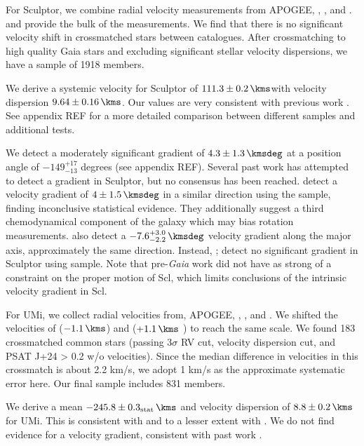 For Sculptor, we combine radial velocity measurements from APOGEE,
\citet{sestito+2023a}, \citet{tolstoy+2023}, and \citet{WMO2009}.
\citet{tolstoy+2023} and \citet{WMO2009} provide the bulk of the
measurements. We find that there is no significant velocity shift in
crossmatched stars between catalogues. After crossmatching to high
quality Gaia stars and excluding significant stellar velocity
dispersions, we have a sample of 1918 members.

We derive a systemic velocity for Sculptor of \(111.3\pm0.2\,\kms\)with
velocity dispersion \(9.64\pm0.16\,\kms\). Our values are very
consistent with previous work \citep[e.g.][\citet{arroyo-polonio+2024},
\citet{battaglia+2008}]{walker+2009}. See appendix REF for a more
detailed comparison between different samples and additional tests.

We detect a moderately significant gradient of \(4.3\pm1.3\,\kmsdeg\) at
a position angle of \(-149_{-13}^{+17}\) degrees (see appendix REF).
Several past work has attempted to detect a gradient in Sculptor, but no
consensus has been reached. \citet{arroyo-polonio+2024} detect a
velocity gradient of \(4\pm1.5\,\kmsdeg\) in a similar direction using
the \citet{tolstoy+2023} sample, finding inconclusive statistical
evidence. They additionally suggest a third chemodynamical component of
the galaxy which may bias rotation measurements. \citet{battaglia+2008}
also detect a \(-7.6_{-2.2}^{+3.0}\,\kmsdeg\) velocity gradient along
the major axis, approximately the same direction. Instead,
\citet{strigari2010}; \citet{martinez-garcia+2023} detect no significant
gradient in Sculptor using \citet{WMO2009} sample. Note that
pre-\emph{Gaia} work did not have as strong of a constraint on the
proper motion of Scl, which limits conclusions of the intrinsic velocity
gradient in Scl.

For UMi, we collect radial velocities from, APOGEE,
\citet{sestito+2023b}, \citet{pace+2020}, and \citet{spencer+2018}. We
shifted the velocities of \citet{spencer+2018} (\(-1.1\,\kms\)) and
\citet{pace+2020} (\(+1.1\,\kms\) ) to reach the same scale. We found
183 crossmatched common stars (passing 3\(\sigma\) RV cut, velocity
dispersion cut, and PSAT J+24 \textgreater{} 0.2 w/o velocities). Since
the median difference in velocities in this crossmatch is about 2.2
km/s, we adopt 1 km/s as the approximate systematic error here. Our
final sample includes 831 members.

We derive a mean \(-245.8\pm0.3_{\rm stat}\,\kms\) and velocity
dispersion of \(8.8\pm0.2\,\kms\) for UMi. This is consistent with
\citet{pace+2020} and to a lesser extent with \citet{spencer+2018}. We
do not find evidence for a velocity gradient, consistent with past work
\citep{pace+2020, martinez-garcia+2023}.

